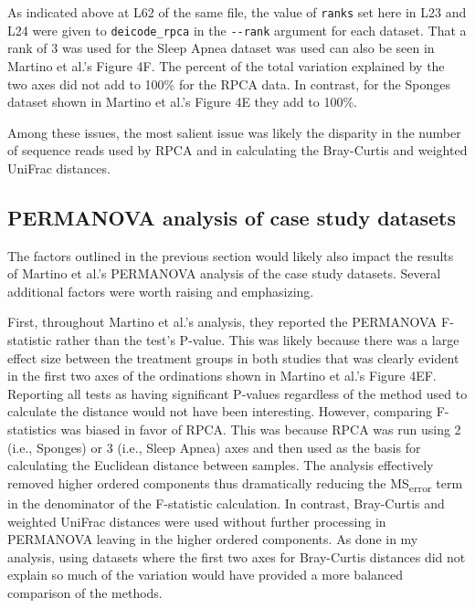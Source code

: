 \documentclass[
]{article}
\begin{document}
\normalsize{}

As indicated above at L62 of the same file, the value of \texttt{ranks}
set here in L23 and L24 were given to \texttt{deicode\_rpca} in the
\texttt{-\/-rank} argument for each dataset. That a rank of 3 was used
for the Sleep Apnea dataset was used can also be seen in Martino et
al.'s Figure 4F. The percent of the total variation explained by the two
axes did not add to 100\% for the RPCA data. In contrast, for the
Sponges dataset shown in Martino et al.'s Figure 4E they add to 100\%.

Among these issues, the most salient issue was likely the disparity in
the number of sequence reads used by RPCA and in calculating the
Bray-Curtis and weighted UniFrac distances.

\subsection{PERMANOVA analysis of case study
datasets}\label{permanova-analysis-of-case-study-datasets}

The factors outlined in the previous section would likely also impact
the results of Martino et al.'s PERMANOVA analysis of the case study
datasets. Several additional factors were worth raising and emphasizing.

First, throughout Martino et al.'s analysis, they reported the PERMANOVA
F-statistic rather than the test's P-value. This was likely because
there was a large effect size between the treatment groups in both
studies that was clearly evident in the first two axes of the
ordinations shown in Martino et al.'s Figure 4EF. Reporting all tests as
having significant P-values regardless of the method used to calculate
the distance would not have been interesting. However, comparing
F-statistics was biased in favor of RPCA. This was because RPCA was run
using 2 (i.e., Sponges) or 3 (i.e., Sleep Apnea) axes and then used as
the basis for calculating the Euclidean distance between samples. The
analysis effectively removed higher ordered components thus dramatically
reducing the MS\textsubscript{error} term in the denominator of the
F-statistic calculation. In contrast, Bray-Curtis and weighted UniFrac
distances were used without further processing in PERMANOVA leaving in
the higher ordered components. As done in my analysis, using datasets
where the first two axes for Bray-Curtis distances did not explain so
much of the variation would have provided a more balanced comparison of
the methods.
\end{document}
